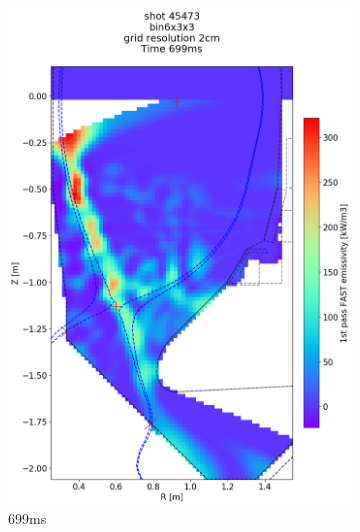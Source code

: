 \begin{figure}
\begin{subfigure}{0.355\linewidth}
         \includegraphics[trim={75 70 25 190},clip,width=\textwidth]{Chapters/chapter2/figs/IRVB-MASTU_shot-45473_export_70.png}
         \vspace*{-6.5mm}
         \caption{699ms}
         \label{fig:45473_export2_4}
     \end{subfigure}
     \begin{subfigure}{0.4\linewidth}
         \centering

\end{subfigure}
\end{figure}
